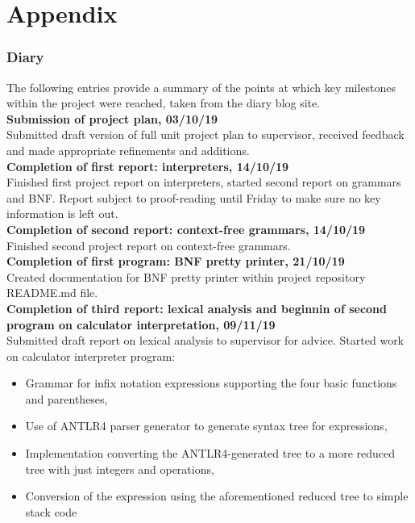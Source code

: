 \documentclass[a4paper, 11pt]{article}
\begin{document}
\clearpage
\part{Appendix}
\setcounter{section}{0}
\section{Diary}
The following entries provide a summary of the points at which key milestones within the project were reached, taken from the diary blog site.
\\\newline
\textbf{Submission of project plan, 03/10/19}\\
Submitted draft version of full unit project plan to supervisor, received feedback and made appropriate refinements and additions.
\\\newline
\textbf{Completion of first report: interpreters, 14/10/19}\\
Finished first project report on interpreters, started second report on grammars and BNF. Report subject to proof-reading until Friday to make sure no key information is left out.
\\\newline
\textbf{Completion of second report: context-free grammars, 14/10/19}\\
Finished second project report on context-free grammars.
\\\newline
\textbf{Completion of first program: BNF pretty printer, 21/10/19}\\
Created documentation for BNF pretty printer within project repository README.md file.
\\\newline
\textbf{Completion of third report: lexical analysis and beginnin of second program on calculator interpretation, 09/11/19}\\
Submitted draft report on lexical analysis to supervisor for advice. Started work on calculator interpreter program:
\begin{itemize}
\item Grammar for infix notation expressions supporting the four basic functions and parentheses,
\item Use of ANTLR4 parser generator to generate syntax tree for expressions,
\item Implementation converting the ANTLR4-generated tree to a more reduced tree with just integers and operations,
\item Conversion of the expression using the aforementioned reduced tree to simple stack code
\end{itemize}
\end{document}
